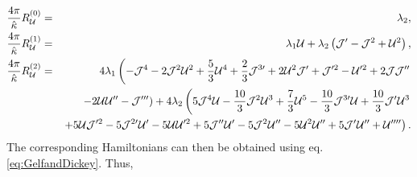 \documentclass[letterpaper,11pt,oneside]{book}
\begin{document}
\begin{eqnarray*}
	\frac{4\pi}{\hat{\kappa}}R_{\mathcal{U}}^{\left(0\right)} & = & \lambda_{2},\\
	\frac{4\pi}{\hat{\kappa}}R_{\mathcal{U}}^{\left(1\right)} & = & \lambda_{1}\mathcal{U}+\lambda_{2}\left(\mathcal{J}^{\prime}-\mathcal{J}^{2}+\mathcal{U}^{2}\right),\\
	\frac{4\pi}{\hat{\kappa}}R_{\mathcal{U}}^{\left(2\right)} & = & 4\lambda_{1}\left(-\mathcal{J}^{4}-2\mathcal{J}^{2}\mathcal{U}^{2}+\frac{5}{3}\mathcal{U}^{4}+\frac{2}{3}\mathcal{J}^{3\prime}+2\mathcal{U}^{2}\mathcal{J}^{\prime}+\mathcal{J}^{\prime2}-\mathcal{U}^{\prime2}+2\mathcal{J}\mathcal{J}^{\prime\prime}\right.\\
	{\color{red}} & {\color{red}} & \left.-2\mathcal{U}\mathcal{U}^{\prime\prime}-\mathcal{J}^{\prime\prime\prime}\right)+4\lambda_{2}\left(5\mathcal{J}^{4}\mathcal{U}-\frac{10}{3}\mathcal{J}^{2}\mathcal{U}^{3}+\frac{7}{3}\mathcal{U}^{5}-\frac{10}{3}\mathcal{J}^{3\prime}\mathcal{U}+\frac{10}{3}\mathcal{J}^{\prime}\mathcal{U}^{3}\right.\\
	{\color{red}} & {\color{red}} & \left.+5\mathcal{U}\mathcal{J}^{\prime2}-5\mathcal{J}^{2\prime}\mathcal{U}^{\prime}-5\mathcal{U}\mathcal{U}^{\prime2}+5\mathcal{J}^{\prime\prime}\mathcal{U}^{\prime}-5\mathcal{J}^{2}\mathcal{U}^{\prime\prime}-5\mathcal{U}^{2}\mathcal{U}^{\prime\prime}+5\mathcal{J}^{\prime}\mathcal{U}^{\prime\prime}+\mathcal{U}^{\prime\prime\prime\prime}\right).
\end{eqnarray*}
The corresponding Hamiltonians can then be obtained using eq. \eqref{eq:GelfandDickey}.
Thus,
\end{document}
